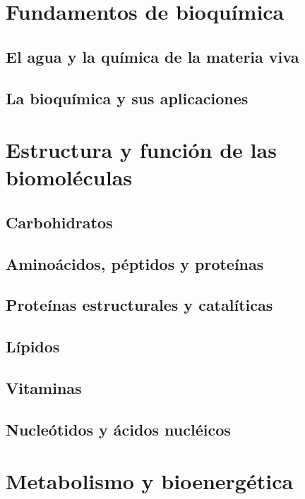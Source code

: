 \documentclass{../summarie}
\begin{document}
\Portada
\Indice
\fancystyle
\onehalfspacing


\part{Fundamentos de bioquímica}

    \chapter{El agua y la química de la materia viva}
    \chapter{La bioquímica y sus aplicaciones}

\part{Estructura y función de las biomoléculas}

    \chapter{Carbohidratos}
    \chapter{Aminoácidos, péptidos y proteínas}
        
        
    \chapter{Proteínas estructurales y catalíticas}
    \chapter{Lípidos}
        
    
    \chapter{Vitaminas}
    \chapter{Nucleótidos y ácidos nucléicos}

\part{Metabolismo y bioenergética}
\end{document}
